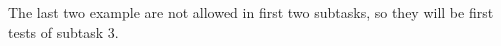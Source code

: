 The last two example are not allowed in first two subtasks, so they will be first tests of subtask 3.